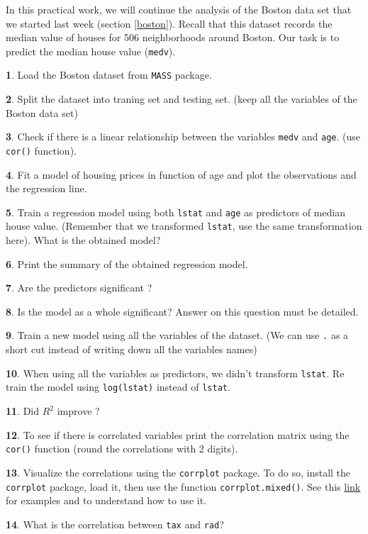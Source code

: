 \documentclass[]{book}
\theoremstyle{definition}
\theoremstyle{definition}
\theoremstyle{definition}
\theoremstyle{remark}
\begin{document}
In this practical work, we will continue the analysis of the Boston data
set that we started last week (section \ref{boston}). Recall that this
dataset records the median value of houses for 506 neighborhoods around
Boston. Our task is to predict the median house value (\texttt{medv}).

\textbf{1}. Load the Boston dataset from \texttt{MASS} package.

\textbf{2}. Split the dataset into traning set and testing set. (keep
all the variables of the Boston data set)

\textbf{3}. Check if there is a linear relationship between the
variables \texttt{medv} and \texttt{age}. (use \texttt{cor()} function).

\textbf{4}. Fit a model of housing prices in function of age and plot
the observations and the regression line.

\textbf{5}. Train a regression model using both \texttt{lstat} and
\texttt{age} as predictors of median house value. (Remember that we
transformed \texttt{lstat}, use the same transformation here). What is
the obtained model?

\textbf{6}. Print the summary of the obtained regression model.

\textbf{7}. Are the predictors significant ?

\textbf{8}. Is the model as a whole significant? Answer on this question
must be detailed.

\textbf{9}. Train a new model using all the variables of the dataset.
(We can use \texttt{.} as a short cut instead of writing down all the
variables names)

\textbf{10}. When using all the variables as predictors, we didn't
transform \texttt{lstat}. Re train the model using \texttt{log(lstat)}
instead of \texttt{lstat}.

\textbf{11}. Did \(R^2\) improve ?

\textbf{12}. To see if there is correlated variables print the
correlation matrix using the \texttt{cor()} function (round the
correlations with 2 digits).

\textbf{13}. Visualize the correlations using the \texttt{corrplot}
package. To do so, install the \texttt{corrplot} package, load it, then
use the function \texttt{corrplot.mixed()}. See this
\href{https://cran.r-project.org/web/packages/corrplot/vignettes/corrplot-intro.html}{link}
for examples and to understand how to use it.

\textbf{14}. What is the correlation between \texttt{tax} and
\texttt{rad}?
\end{document}
